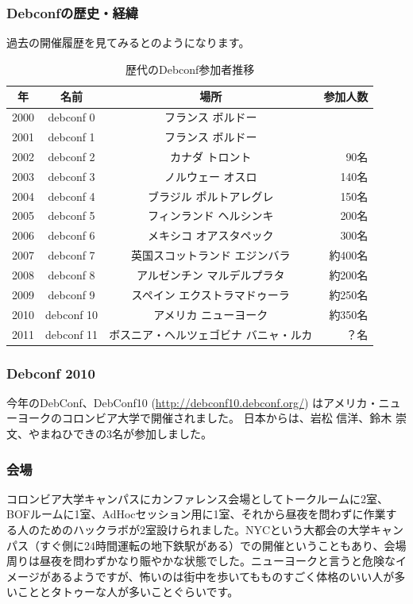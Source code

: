 \documentclass[mingoth,a4paper]{jsarticle}
\begin{document}
\subsubsection{Debconfの歴史・経緯}
過去の開催履歴を見てみるとのようになります。

\begin{table}[H]
\caption{歴代のDebconf参加者推移}
\label{tab:debconflist}
 \begin{center}
 {\footnotesize
 \begin{tabular}{|c|c|c|r|}
 \hline
 年 & 名前 & 場所 & 参加人数 \\
 \hline
 2000 & debconf 0 &フランス ボルドー & \\
 2001 & debconf 1 &フランス ボルドー & \\
 2002 & debconf 2 &カナダ トロント & 90名 \\
 2003 & debconf 3 &ノルウェー オスロ & 140名 \\
 2004 & debconf 4 &ブラジル ポルトアレグレ &  150名 \\
 2005 & debconf 5 &フィンランド ヘルシンキ & 200名 \\
 2006 & debconf 6 &メキシコ オアスタペック & 300名 \\
 2007 & debconf 7 &英国スコットランド エジンバラ & 約400名 \\
 2008 & debconf 8 &アルゼンチン マルデルプラタ & 約200名 \\               
 2009 & debconf 9 &スペイン エクストラマドゥーラ & 約250名 \\
 2010 & debconf 10 &アメリカ ニューヨーク & 約350名 \\
 2011 & debconf 11 &ボスニア・ヘルツェゴビナ バニャ・ルカ & ？名\\
 \hline
 \end{tabular}
 }
 \end{center}
\end{table}

\subsubsection{Debconf 2010}
今年のDebConf、DebConf10 (\url{http://debconf10.debconf.org/}) はアメリカ・ニューヨークのコロンビア大学で開催されました。
日本からは、岩松 信洋、鈴木 崇文、やまねひできの3名が参加しました。

\subsubsection{会場}
コロンビア大学キャンパスにカンファレンス会場としてトークルームに2室、BOFルームに1室、AdHocセッション用に1室、それから昼夜を問わずに作業する人のためのハックラボが2室設けられました。NYCという大都会の大学キャンパス（すぐ側に24時間運転の地下鉄駅がある）での開催ということもあり、会場周りは昼夜を問わずかなり賑やかな状態でした。ニューヨークと言うと危険なイメージがあるようですが、怖いのは街中を歩いてもものすごく体格のいい人が多いこととタトゥーな人が多いことぐらいです。
\end{document}

